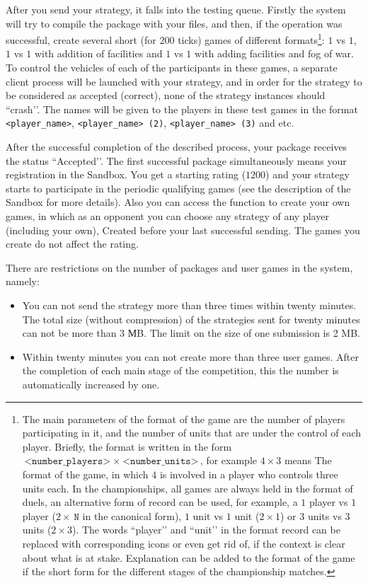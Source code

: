 After you send your strategy, it falls into the testing queue. Firstly the system will try to compile the package with your
files, and then, if the operation was successful, create several short (for $200$ ticks) games of different formats\footnote [6]{The main
parameters of the format of the game are the number of players participating in it, and the number of units that are under the control of each player.
Briefly, the format is written in the form $\texttt{<number\_players>}~\times~\texttt{<number\_units>}$, for example $4\times3$ means
The format of the game, in which $4$ is involved in a player who controls three units each. In the championships, all games are always held in the format
of duels, an alternative form of record can be used, for example, a $1$ player vs $1$ player ($2\times~\texttt{N}$ in the canonical form), $1$
unit vs $1$ unit ($2\times1$) or $3$ units vs $3$ units ($2\times3$). The words ``player’’ and ``unit’’ in the format record can be replaced
with corresponding icons or even get rid of, if the context is clear about what is at stake. Explanation can be added to the format of the game
if the short form for the different stages of the championship matches.}: $1$ vs $1$, $1$ vs $1$ with addition of facilities and $1$ vs $1$ with
adding facilities and fog of war. To control the vehicles of each of the participants in these games, a separate client process will be launched with
your strategy, and in order for the strategy to be considered as accepted (correct), none of the strategy instances should ``crash’’.
The names will be given to the players in these test games in the format \texttt{<player\_name>}, \texttt{<player\_name> (2)}, \texttt{<player\_name> (3)} and
etc.

After the successful completion of the described process, your package receives the status ``Accepted’’. The first successful package simultaneously means
your registration in the Sandbox. You get a starting rating ($1200$) and your strategy starts to participate in the periodic
qualifying games (see the description of the Sandbox for more details). Also you can access the function
to create your own games, in which as an opponent you can choose any strategy of any player (including your own),
Created before your last successful sending. The games you create do not affect the rating.

There are restrictions on the number of packages and user games in the system, namely:
\vspace{-0.15in}
\begin{itemize}
  \item You can not send the strategy more than three times within twenty minutes. The total size (without compression) of the strategies sent for twenty
        minutes can not be more than 3 МB. The limit on the size of one submission is 2 MB.
\vspace{-0.10in}
  \item Within twenty minutes you can not create more than three user games. After the completion of each main stage of the competition, this
        the number is automatically increased by one.
\vspace{-0.10in}
\end{itemize}

